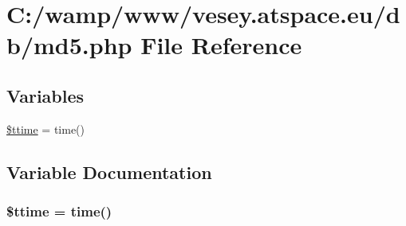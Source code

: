 \hypertarget{md5_8php}{\section{C\-:/wamp/www/vesey.atspace.\-eu/db/md5.php File Reference}
\label{md5_8php}
}
\subsection*{Variables}
\begin{DoxyCompactItemize}
\item 
\hyperlink{md5_8php_addb41382b9288c0cf3382d3912cab2ad}{\$ttime} = time()
\end{DoxyCompactItemize}


\subsection{Variable Documentation}
\hypertarget{md5_8php_addb41382b9288c0cf3382d3912cab2ad}{
\subsubsection[{\$ttime}]{\setlength{\rightskip}{0pt plus 5cm}\$ttime = time()}}\label{md5_8php_addb41382b9288c0cf3382d3912cab2ad}
